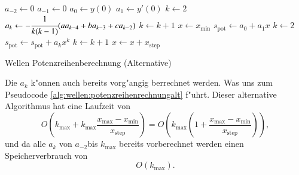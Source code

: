 \begin{algorithm}
	\begin{algorithmic}[1]
		\State $a_{-2} \gets 0$
		\State $a_{-1} \gets 0$
		\State $a_0 \gets y(0)$
		\State $a_1 \gets y'(0)$
		\State $k \gets 2$
			\State $a_k \gets -\cfrac{1}{k(k-1)} (aa_{k-4}+ba_{k-3}+ca_{k-2})$
			\State $k \gets k + 1$
		\EndFor
		\State $x \gets x_{\text{min}}$
			\State $s_{\text{pot}} \gets a_0 + a_1x$
			\State $k \gets 2$
				\State $s_{\text{pot}} \gets s_{\text{pot}} + a_k x^k$
				\State $k \gets k + 1$
			\EndFor
			\State $x \gets x + x_{\text{step}}$
		\EndFor
	\end{algorithmic}
	\caption{Wellen Potenzreihenberechnung (Alternative)}
	\label{alg:wellen:potenzreihenrechnungalt}
\end{algorithm}

Die $a_k$ k"onnen auch bereits vorg"angig berrechnet werden. Was uns zum 
Pseudocode \ref{alg:wellen:potenzreihenrechnungalt} f"uhrt. Dieser 
alternative Algorithmus hat eine Laufzeit von
\begin{equation*}
	O
	\left(k_{\text{max}} + 
		k_{\text{max}}\frac{x_{\text{max}}-x_{\text{min}}}{x_{\text{step}}}
	\right)
	=
	O
	\left(
		k_{\text{max}}
		\left(
			1+\frac{x_{\text{max}}-x_{\text{min}}}{x_{\text{step}}}
		\right)
	\right),
\end{equation*}
und da alle $a_k$ von $a_{-2}$bis $k_{\text{max}}$ bereits vorberechnet werden 
einen Speicherverbrauch von
\begin{equation*}
	O
	\left(
		k_{\text{max}}
	\right).
\end{equation*}